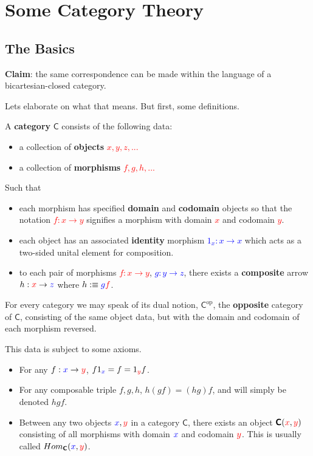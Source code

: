 \documentclass[tikz]{beamer}
\newcommand{\cat}[1]{\bm{ \mathsf{#1} }}
\newcommand{\cc}{\cat{C}}
\newcommand{\op}[1]{#1^{\text{op}}}
\newcommand{\opc}{\op{\cc}}
\newcommand{\red}[1]{\textcolor{red}{#1}}
\newcommand{\mred}[1]{\textcolor{red}{$#1$}}
\newcommand{\blue}[1]{\textcolor{blue}{#1}}
\newcommand{\mblue}[1]{\textcolor{blue}{$#1$}}
\theoremstyle{definition}
\begin{document}
\section{Some Category Theory}


\subsection{The Basics}

\frame
{
	\textbf{Claim}: the same correspondence can be made within the language of a bicartesian-closed category. 
}

\frame
{
	Lets elaborate on what that means. But first, some definitions.
}

\frame
{
	\begin{definition}[Category]
		A \textbf{category} $\cc$ consists of the following data: 
		
		\begin{itemize}
			\item a collection of \textbf{objects} \mred{x, y, z,...}
			\item a collection of \textbf{morphisms} \mred{f,g,h,...}
		\end{itemize}
		
		Such that 
		
		\begin{itemize}
			\item each morphism has specified \textbf{domain} and \textbf{codomain} objects so that the notation \mred{f : x \to y} signifies a morphism with domain \mred{x} and codomain \mred{y}. 
			\item each object has an associated \textbf{identity} morphism \mblue{1_x : x \to x} which acts as a two-sided unital element for composition.
			\item to each pair of morphisms \mred{f : x \to y}, \mblue{g : y \to z}, there exists a \textbf{composite} arrow $h : \red{x} \to \blue{z}$ where $h :\equiv \blue{g}\red{f}$. 
		\end{itemize}
	\end{definition}
}

\frame
{
	For every category we may speak of its dual notion, $\opc$, the \textbf{opposite} category of $\cc$, consisting of the same object data, but with the domain and codomain of each morphism reversed.
}

\frame
{
	This data is subject to some axioms. 
	
	\begin{itemize}
	
		\item For any $f : \blue{x} \to \red{y}$, $f1_{\blue{x}} = f =  1_{\red{y}} f$. 
		\item For any composable triple $f,g,h$, $h(gf) = (hg)f$, and will simply be denoted $hgf$.
		\item Between any two objects $\blue{x}, \red{y}$ in a category $\cc$, there exists an object $\cc(\red{x},\red{y})$ consisting of all morphisms with domain $\blue{x}$ and codomain $\red{y}$. This is usually called $Hom_{\cc}(\blue{x}, \red{y})$.
	\end{itemize}
}
\end{document}
